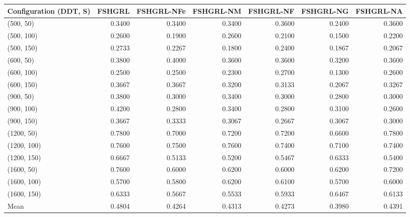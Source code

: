 \begin{tabular}{lrrrrrr}
\toprule
Configuration (DDT, S) & FSHGRL & FSHGRL-NFe & FSHGRL-NM & FSHGRL-NF & FSHGRL-NG & FSHGRL-NA \\
\midrule
(500, 50) & 0.3400 & 0.3400 & 0.3400 & 0.3600 & 0.2400 & 0.3600 \\
(500, 100) & 0.2600 & 0.1900 & 0.2600 & 0.2100 & 0.1500 & 0.2200 \\
(500, 150) & 0.2733 & 0.2267 & 0.1800 & 0.2400 & 0.1867 & 0.2067 \\
(600, 50) & 0.3800 & 0.4000 & 0.3600 & 0.3600 & 0.3200 & 0.3600 \\
(600, 100) & 0.2500 & 0.2500 & 0.2300 & 0.2700 & 0.1300 & 0.2600 \\
(600, 150) & 0.3667 & 0.3667 & 0.3200 & 0.3133 & 0.2067 & 0.3267 \\
(900, 50) & 0.3800 & 0.3000 & 0.3400 & 0.3000 & 0.2800 & 0.3000 \\
(900, 100) & 0.4200 & 0.2800 & 0.3400 & 0.2800 & 0.3100 & 0.2600 \\
(900, 150) & 0.3667 & 0.3333 & 0.3067 & 0.2667 & 0.3067 & 0.3000 \\
(1200, 50) & 0.7800 & 0.7000 & 0.7200 & 0.7200 & 0.6600 & 0.7800 \\
(1200, 100) & 0.7600 & 0.7500 & 0.7600 & 0.7400 & 0.7100 & 0.7400 \\
(1200, 150) & 0.6667 & 0.5133 & 0.5200 & 0.5467 & 0.6333 & 0.5400 \\
(1600, 50) & 0.7600 & 0.6000 & 0.6200 & 0.6000 & 0.6200 & 0.7200 \\
(1600, 100) & 0.5700 & 0.5800 & 0.6200 & 0.6100 & 0.5700 & 0.6000 \\
(1600, 150) & 0.6333 & 0.5667 & 0.5533 & 0.5933 & 0.6467 & 0.6133 \\
Mean & 0.4804 & 0.4264 & 0.4313 & 0.4273 & 0.3980 & 0.4391 \\
\bottomrule
\end{tabular}
